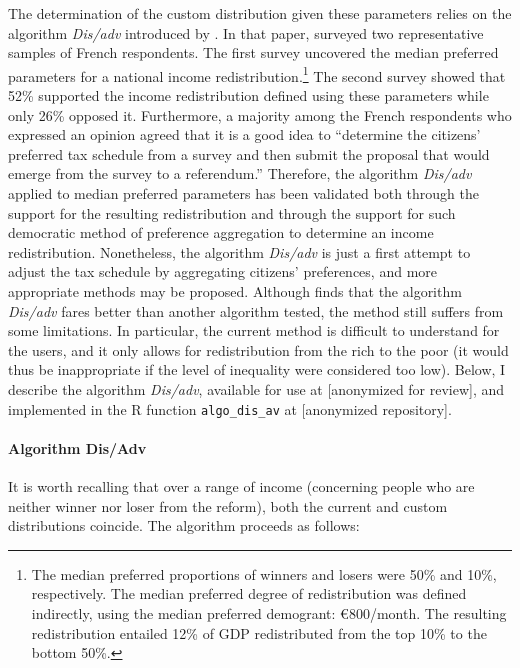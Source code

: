 \documentclass[12pt,english]{article}
\begin{document}
\begin{bibunit}
The determination of the custom distribution given these parameters relies on the algorithm \textit{Dis/adv} introduced by \cite{fabre_french_2022}. In that paper, \cite{fabre_french_2022} surveyed two representative samples of French respondents. The first survey uncovered the median preferred parameters for a national income redistribution.\footnote{The median preferred proportions of winners and losers were 50\% and 10\%, respectively. The median preferred degree of redistribution was defined indirectly, using the median preferred demogrant: \euro{}800/month. The resulting redistribution entailed 12\% of GDP redistributed from the top 10\% to the bottom 50\%.} The second survey showed that 52\% supported the income redistribution defined using these parameters while only 26\% opposed it. Furthermore, a majority among the French respondents who expressed an opinion agreed that it is a good idea to ``determine the citizens' preferred tax schedule from a survey and then submit the proposal that would emerge from the survey to a referendum.'' Therefore, the algorithm \textit{Dis/adv} applied to median preferred parameters has been validated both through the support for the resulting redistribution and through the support for such democratic method of preference aggregation to determine an income redistribution. Nonetheless, the algorithm \textit{Dis/adv} is just a first attempt to adjust the tax schedule by aggregating citizens' preferences, and more appropriate methods may be proposed. Although \cite{fabre_french_2022} finds that the algorithm \textit{Dis/adv} fares better than another algorithm tested, the method still suffers from some limitations. In particular, the current method is difficult to understand for the users, and it only allows for redistribution from the rich to the poor (it would thus be inappropriate if the level of inequality were considered too low). Below, I describe the algorithm \textit{Dis/adv}, available for use at [anonymized for review], and implemented in the R function \verb|algo_dis_av| at [anonymized repository]. %

\paragraph{Algorithm Dis/Adv} 

It is worth recalling that over a range of income (concerning people who are neither winner nor loser from the reform), both the current and custom distributions coincide. The algorithm proceeds as follows:


\end{bibunit}
\end{document}
